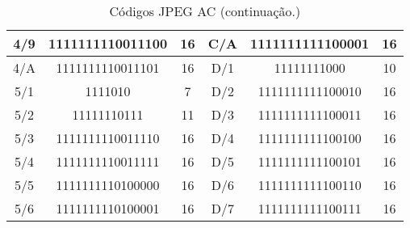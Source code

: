 \begin{table}[!ht]
\begin{tabular}{|c|c|c|c|c|c|}
4/9                                                        & 1111111110011100 & 16      & C/A                                                        & 1111111111100001 & 16      \\ \hline
4/A                                                        & 1111111110011101 & 16      & D/1                                                        & 11111111000      & 10      \\ \hline
5/1                                                        & 1111010          & 7       & D/2                                                        & 1111111111100010 & 16      \\ \hline
5/2                                                        & 11111110111      & 11      & D/3                                                        & 1111111111100011 & 16      \\ \hline
5/3                                                        & 1111111110011110 & 16      & D/4                                                        & 1111111111100100 & 16      \\ \hline
5/4                                                        & 1111111110011111 & 16      & D/5                                                        & 1111111111100101 & 16      \\ \hline
5/5                                                        & 1111111110100000 & 16      & D/6                                                        & 1111111111100110 & 16      \\ \hline
5/6                                                        & 1111111110100001 & 16      & D/7                                                        & 1111111111100111 & 16      \\ \hline
\end{tabular}
\caption{Códigos JPEG AC (continuação.)}
\label{Cod-AC2}
\end{table}

